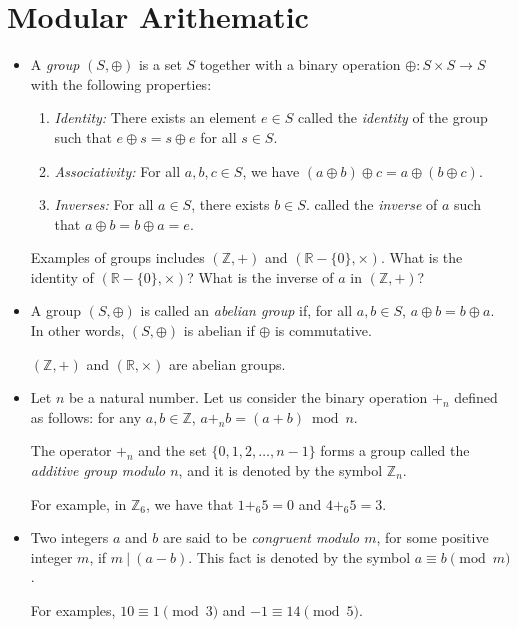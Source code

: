 \documentclass{article}
\newcommand{\divides}{\ |\ }
\begin{document}
\section{Modular Arithematic}
\begin{itemize}
\item A \emph{group} $(S, \oplus)$ is a set $S$ together with a binary operation $\oplus: S \times S \rightarrow S$ with the following properties:
\begin{enumerate}
\item \emph{Identity:} There exists an element $e \in S$ called the \emph{identity} of the group such that $e \oplus s = s \oplus e$ for all $s \in S$.
\item \emph{Associativity:} For all $a, b, c \in S$, we have $(a \oplus b) \oplus c = a \oplus (b \oplus c)$.
\item \emph{Inverses:} For all $a \in S$, there exists $b \in S$. called the \emph{inverse} of $a$ such that $a \oplus b = b \oplus a = e$.
\end{enumerate}
Examples of groups includes $(\mathbb{Z}, +)$ and $(\mathbb{R}-\{0\}, \times)$. What is the identity of $(\mathbb{R}-\{ 0\}, \times)$? What is the inverse of $a$ in $(\mathbb{Z}, +)$?

\item A group $(S, \oplus)$ is called an \emph{abelian group} if, for all $a,b \in S$, $a \oplus b = b \oplus a$. In other words, $(S, \oplus)$ is abelian if $\oplus$ is commutative.

$(\mathbb{Z}, +)$ and $(\mathbb{R}, \times)$ are abelian groups.

\item Let $n$ be a natural number. Let us consider the binary operation $+_n$ defined as follows: for any $a, b \in \mathbb{Z}$, $a +_n b = (a+b) \bmod n.$

The operator $+_n$ and the set $\{ 0, 1, 2, \dotsc, n-1 \}$ forms a group called the \emph{additive group modulo $n$}, and it is denoted by the symbol $\mathbb{Z}_n$.

For example, in $\mathbb{Z}_6$, we have that $1 +_6 5 = 0$ and $4 +_6 5 = 3$.

\item Two integers $a$ and $b$ are said to be \emph{congruent modulo $m$}, for some positive integer $m$, if $m \divides (a-b)$. This fact is denoted by the symbol $a \equiv b \pmod m$.

For examples, $10 \equiv 1 \pmod 3$ and $-1 \equiv 14 \pmod 5$.


\end{itemize}
\end{document}
